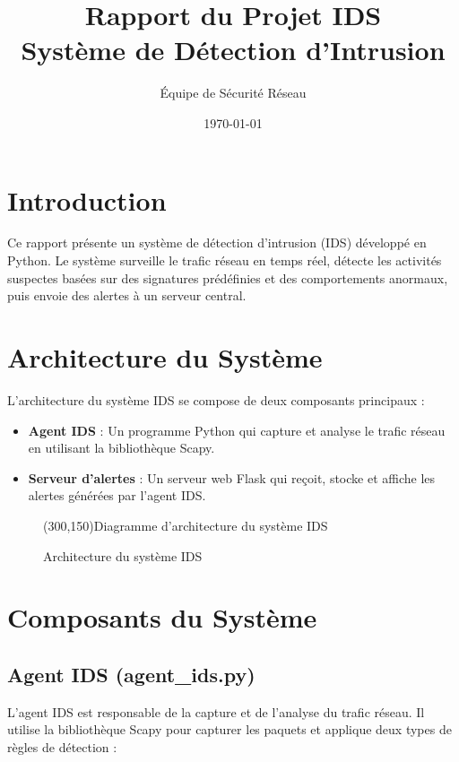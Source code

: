 \documentclass[12pt,a4paper]{article}
\title{Rapport du Projet IDS\\
\large Système de Détection d'Intrusion}
\author{Équipe de Sécurité Réseau}
\date{\today}
\begin{document}
\maketitle

\tableofcontents
\newpage

\section{Introduction}
Ce rapport présente un système de détection d'intrusion (IDS) développé en Python. Le système surveille le trafic réseau en temps réel, détecte les activités suspectes basées sur des signatures prédéfinies et des comportements anormaux, puis envoie des alertes à un serveur central.

\section{Architecture du Système}

L'architecture du système IDS se compose de deux composants principaux :

\begin{itemize}
    \item \textbf{Agent IDS} : Un programme Python qui capture et analyse le trafic réseau en utilisant la bibliothèque Scapy.
    \item \textbf{Serveur d'alertes} : Un serveur web Flask qui reçoit, stocke et affiche les alertes générées par l'agent IDS.
\end{itemize}

\begin{figure}[h]
    \centering
    \framebox(300,150){Diagramme d'architecture du système IDS}
    \caption{Architecture du système IDS}
\end{figure}

\section{Composants du Système}

\subsection{Agent IDS (agent\_ids.py)}
L'agent IDS est responsable de la capture et de l'analyse du trafic réseau. Il utilise la bibliothèque Scapy pour capturer les paquets et applique deux types de règles de détection :
\end{document}
